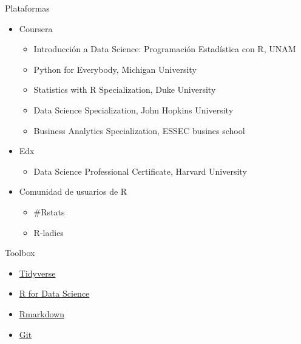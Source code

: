 \documentclass[
  10,
  ignorenonframetext,
]{beamer}
\providecommand{\tightlist}{%
  \setlength{\itemsep}{0pt}\setlength{\parskip}{0pt}}
\begin{document}
\begin{frame}{Plataformas}
\protect\hypertarget{plataformas}{}
\begin{itemize}
\tightlist
\item
  Coursera

  \begin{itemize}
  \tightlist
  \item
    Introducción a Data Science: Programación Estadística con R, UNAM
  \item
    Python for Everybody, Michigan University
  \item
    Statistics with R Specialization, Duke University
  \item
    Data Science Specialization, John Hopkins University
  \item
    Business Analytics Specialization, ESSEC busines school
  \end{itemize}
\item
  Edx

  \begin{itemize}
  \tightlist
  \item
    Data Science Professional Certificate, Harvard University
  \end{itemize}
\item
  Comunidad de usuarios de R

  \begin{itemize}
  \tightlist
  \item
    \#Rstats
  \item
    R-ladies
  \end{itemize}
\end{itemize}
\end{frame}

\begin{frame}{Toolbox}
\protect\hypertarget{toolbox}{}
\begin{itemize}
\tightlist
\item
  \href{https://www.tidyverse.org/}{Tidyverse}
\item
  \href{https://r4ds.had.co.nz/}{R for Data Science}
\item
  \href{https://bookdown.org/yihui/rmarkdown/}{Rmarkdown}
\item
  \href{https://happygitwithr.com/}{Git}
\end{itemize}
\end{frame}
\end{document}
